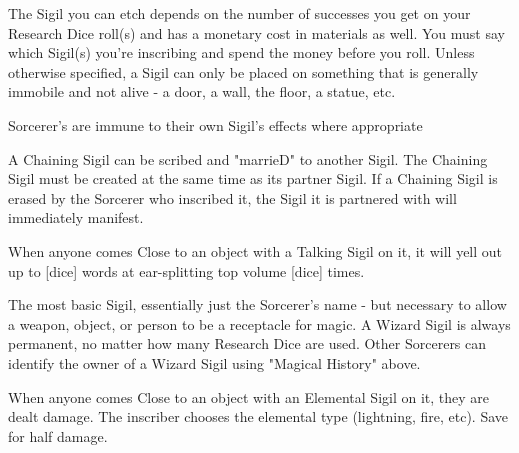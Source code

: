 {  

The Sigil you can etch depends on the number of successes you get on your Research Dice roll(s) and has a monetary cost in materials as well.  You must say which Sigil(s) you're inscribing and spend the money before you roll.  Unless otherwise specified, a Sigil can only be placed on something that is generally immobile and not alive - a door, a wall, the floor, a statue, etc.  

Sorcerer's are immune to their own Sigil's effects where appropriate




  A Chaining Sigil can be scribed and "marrieD" to another Sigil.  The Chaining Sigil must be created at the same time as its partner Sigil.  If a Chaining Sigil is erased by the Sorcerer who inscribed it, the Sigil it is partnered with will immediately manifest.

 When anyone comes Close to an object with a Talking Sigil on it, it will yell out up to [dice] words at ear-splitting top volume [dice] times.



The most basic Sigil, essentially just the Sorcerer's name - but necessary to allow a weapon, object, or person to be a receptacle for magic.  A Wizard Sigil is always permanent, no matter how many Research Dice are used.  Other Sorcerers can identify the owner of a Wizard Sigil using "Magical History" above.





When anyone comes Close to an object with an Elemental Sigil on it, they are dealt \SUMDICE damage.  The inscriber chooses the elemental type (lightning, fire, etc).  Save for half damage.

}
